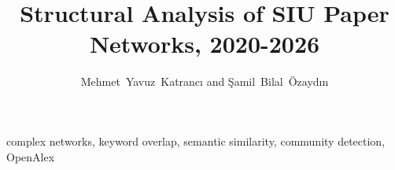 \documentclass[journal]{IEEEtran}
\begin{document}
\title{Structural Analysis of SIU Paper Networks, 2020-2026}

\author{Mehmet~Yavuz~Katrancı and Şamil~Bilal~Özaydın}

\maketitle

\begin{abstract}

\end{abstract}

\begin{IEEEkeywords}
complex networks, keyword overlap, semantic similarity, community detection, OpenAlex
\end{IEEEkeywords}







\nocite{priem2022openalex}


\end{document}
